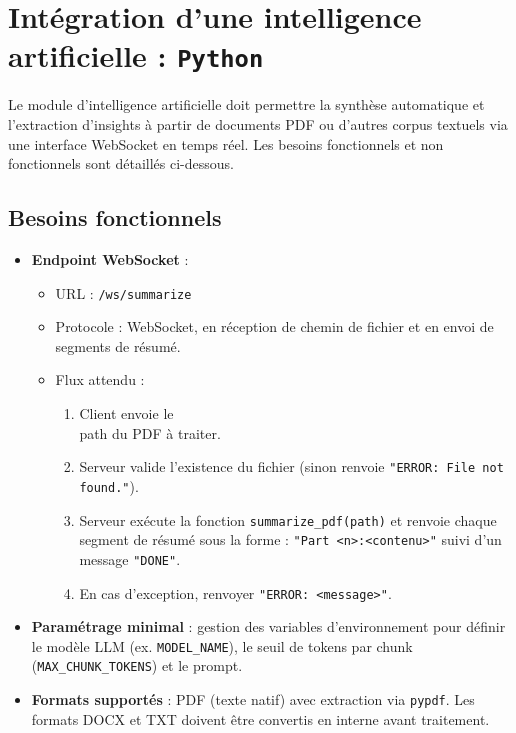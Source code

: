 \documentclass[12pt]{rapportPfe}
\begin{document}

\section{Intégration d'une intelligence artificielle : \texttt{Python}}
Le module d’intelligence artificielle doit permettre la synthèse automatique et l’extraction d’insights à partir de documents PDF ou d’autres corpus textuels via une interface WebSocket en temps réel. Les besoins fonctionnels et non fonctionnels sont détaillés ci-dessous.

\subsection{Besoins fonctionnels}
\begin{itemize}[itemsep=0.8em]
  \item \textbf{Endpoint WebSocket} : 
    \begin{itemize}
      \item URL : \texttt{/ws/summarize}
      \item Protocole : WebSocket, en réception de chemin de fichier et en envoi de segments de résumé.
      \item Flux attendu :
        \begin{enumerate}
          \item Client envoie le \\path du PDF à traiter.
          \item Serveur valide l’existence du fichier (sinon renvoie \texttt{"ERROR: File not found."}).
          \item Serveur exécute la fonction \texttt{summarize\_pdf(path)} et renvoie chaque segment de résumé sous la forme : 
            \texttt{"Part <n>:<contenu>"} suivi d’un message \texttt{"DONE"}.
          \item En cas d’exception, renvoyer \texttt{"ERROR: <message>"}.
        \end{enumerate}
    \end{itemize}
  \item \textbf{Paramétrage minimal} : gestion des variables d’environnement pour définir le modèle LLM (ex. \texttt{MODEL\_NAME}), le seuil de tokens par chunk (\texttt{MAX\_CHUNK\_TOKENS}) et le prompt.
  \item \textbf{Formats supportés} : PDF (texte natif) avec extraction via \texttt{pypdf}. Les formats DOCX et TXT doivent être convertis en interne avant traitement.
\end{itemize}
\end{document}
